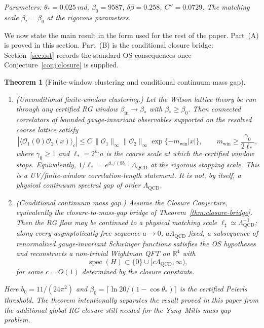 \documentclass[11pt]{article}
\newtheorem{theorem}{Theorem}[section]
\theoremstyle{definition}
\newcommand{\R}{\mathbb{R}}
\newcommand{\Lam}{\Lambda_{\mathrm{QCD}}}
\begin{document}
\noindent\emph{Parameters: $\theta_*=0.025$\,rad,
$\beta_0=9587$, $\delta\beta=0.258$, $C''=0.0729$.
The matching scale $\beta_*=\beta_0$ at the rigorous parameters.}

\medskip

We now state the main result in the form used for the rest of the
paper.  Part~(A) is proved in this section.  Part~(B) is the conditional
closure bridge: Section~\ref{sec:ost} records the standard OS
consequences once Conjecture~\ref{conj:closure} is supplied.


\begin{theorem}[Finite-window clustering and conditional continuum mass gap]%
\label{thm:unconditional}
\mbox{}
\begin{enumerate}[label=(\Alph*)]
\item \emph{(Unconditional finite-window clustering.)}
Let the Wilson lattice theory be run through any certified RG window
$\beta_{\mathrm{in}}\to\beta_*$ with $\beta_*\ge\beta_0$.  Then
connected correlators of bounded gauge-invariant observables supported
on the resolved coarse lattice satisfy
\begin{equation}
|\langle\mathcal{O}_1(0)\mathcal{O}_2(x)\rangle_c|
\le C\,\|\mathcal{O}_1\|_\infty\|\mathcal{O}_2\|_\infty
\exp\{-m_{\mathrm{win}}|x|\},
\qquad
m_{\mathrm{win}}\ge\frac{\gamma_0}{2\ell_*},
\end{equation}
where $\gamma_0\ge 1$ and $\ell_*=2^{k_*}a$ is the coarse scale at
which the certified window stops.  Equivalently,
$1/\ell_*=e^{\beta_*/(8b_0)}\Lam$ at the rigorous stopping scale.
This is a UV/finite-window correlation-length statement.  It is not,
by itself, a physical continuum spectral gap of order $\Lam$.

\item \emph{(Conditional continuum mass gap.)}
Assume the Closure Conjecture, equivalently the closure-to-mass-gap
bridge of Theorem~\ref{thm:closure-bridge}.  Then the RG flow may be
continued to a physical matching scale $\ell_\sharp\simeq \Lam^{-1}$;
along every asymptotically-free sequence $a\to0$, $a\Lam$ fixed, a
subsequence of renormalized gauge-invariant Schwinger functions
satisfies the OS hypotheses and reconstructs a non-trivial Wightman
QFT on $\R^4$ with
\[
\operatorname{spec}(H)\subset\{0\}\cup[c\Lam,\infty),
\]
for some $c=O(1)$ determined by the closure constants.
\end{enumerate}
Here $b_0=11/(24\pi^2)$ and
$\beta_0=\lceil\ln 20/(1-\cos\theta_*)\rceil$ is the certified
Peierls threshold.  The theorem intentionally separates the result
proved in this paper from the additional global RG closure still
needed for the Yang--Mills mass gap problem.
\end{theorem}
\end{document}
